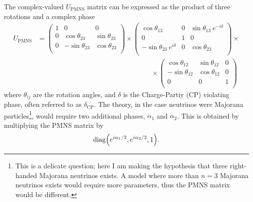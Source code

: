 The complex-valued $U_\mathrm{PMNS}$ matrix can be expressed as the product of three rotations and a complex phase \begin{equation}
    \begin{aligned}
        U_\mathrm{PMNS} &= \begin{pmatrix}
            1 & 0 & 0\\
            0 & \cos\theta_{23} & \sin\theta_{23} \\
            0 & -\sin\theta_{23} & \cos\theta_{23} \\
        \end{pmatrix} \times \begin{pmatrix}
            \cos\theta_{13} & 0 & \sin\theta_{13}\ e^{-i\delta} \\
            0 & 1 & 0\\
            -\sin\theta_{23}\ e^{i\delta} & 0 & \cos\theta_{23} \\
        \end{pmatrix} \times\\ 
        &\hspace{7cm}\times \begin{pmatrix}
            \cos\theta_{12} & \sin\theta_{12} & 0\\
            -\sin\theta_{12} & \cos\theta_{12} & 0\\
            0 & 0 & 1\\
        \end{pmatrix}
    \end{aligned} \label{eq:PMNS}
\end{equation} where $\theta_{ij}$ are the rotation angles, and $\delta$ is the Charge-Partiy (CP) violating phase, often referred to as $\delta_\mathrm{CP}$. The theory, in the case neutrinos were Majorana particles\footnote{This is a delicate question; here I am making the hypothesis that three right-handed Majorana neutrinos exists. A model where more than $n=3$ Majorana neutrinos exists would require more parameters, thus the PMNS matrix would be different.}, would require two additional phases, $\alpha_1$ and $\alpha_2$. This is obtained by multiplying the PMNS matrix by \[\mathrm{diag}\qty(e^{i\alpha_1/2}, e^{i\alpha_2/2}, 1).\]

